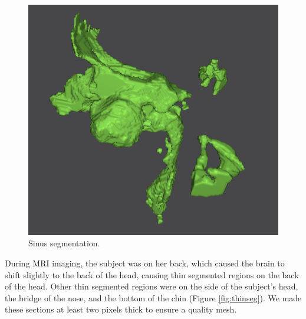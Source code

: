 \begin{figure}[H]
\begin{center}
\includegraphics[width=.49\textwidth]{Figures/sinus_iso}
\caption{Sinus segmentation.}
\label{fig:sinus}
\end{center}
\end{figure}

During MRI imaging, the subject was on her back, which caused the brain to shift slightly to the back of the head, causing thin segmented regions on the back of the head. Other thin segmented regions were on the side of the subject's head, the bridge of the nose, and the bottom of the chin (Figure \ref{fig:thinseg}). We made these sections at least two pixels thick to ensure a quality mesh.

